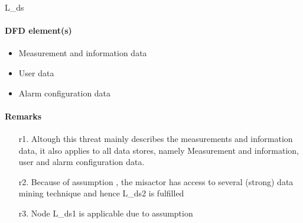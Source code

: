 L\_ds

\paragraph{DFD element(s)}

\begin{itemize}
  \item Measurement and information data
  \item User data
  \item Alarm configuration data
\end{itemize}

\paragraph{Remarks}

	\begin{enumerate}
         \item[r1.] Altough this threat mainly describes the measurements
         and information data, it also applies to all data stores, namely
         Measurement and information, user and alarm configuration data.
         \item[r2.] Because of assumption %
		 , the misactor has access to several (strong) data mining technique and hence
		 L\_ds2 is fulfilled
         \item[r3.] Node L\_ds1 is applicable due to assumption %
    \end{enumerate}
